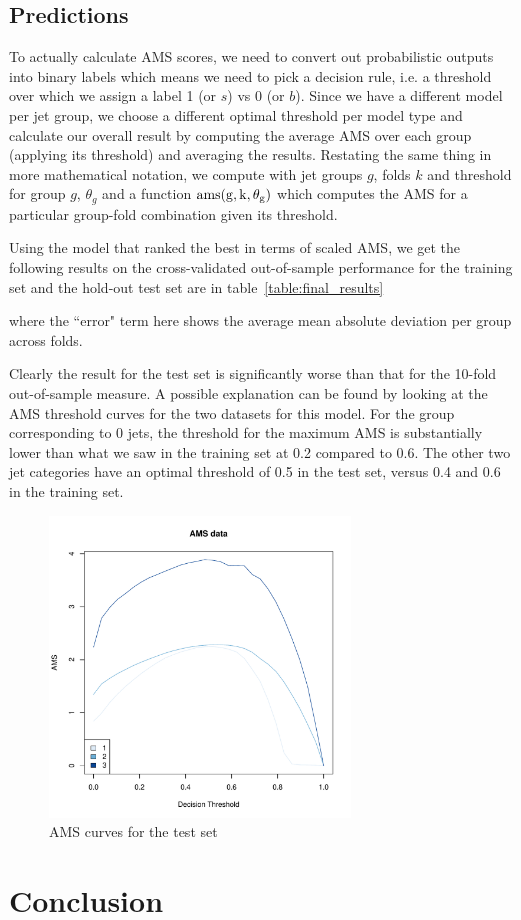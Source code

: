 \subsection{Predictions}
To actually calculate AMS scores, we need to convert out probabilistic outputs into binary labels which means we need to pick a decision rule, i.e. a threshold over which we assign a label 1 (or $s$) vs 0 (or $b$). Since we have a different model per jet group, we choose a different optimal threshold per model type and calculate our overall result by computing the average AMS over each group (applying its threshold) and averaging the results. Restating the same thing in more mathematical notation, we compute 
with jet groups $g$, folds $k$ and threshold for group $g$, $\theta_g$ and a function $\rm{ams}(g, k, \theta_g)$ which computes the AMS for a particular group-fold combination given its threshold.

Using the model that ranked the best in terms of scaled AMS, we get the following results on the cross-validated out-of-sample performance for the training set and the hold-out test set are in table~\ref{table:final_results}

where the ``error" term here shows the average mean absolute deviation per group across folds. 

Clearly the result for the test set is significantly worse than that for the 10-fold out-of-sample measure. A possible explanation can be found by looking at the AMS threshold curves for the two datasets for this model. For the group corresponding to 0 jets, the threshold for the maximum AMS is substantially lower than what we saw in the training set at 0.2 compared to 0.6. The other two jet categories have an optimal threshold of 0.5 in the test set, versus 0.4 and 0.6 in the training set. 

\begin{figure}[h]
    \includegraphics[width=8cm]{validation-ams-curves.pdf}
    \caption{AMS curves for the test set}
\end{figure}

\section{Conclusion}
\label{conclusion}

\pagebreak 


{}


